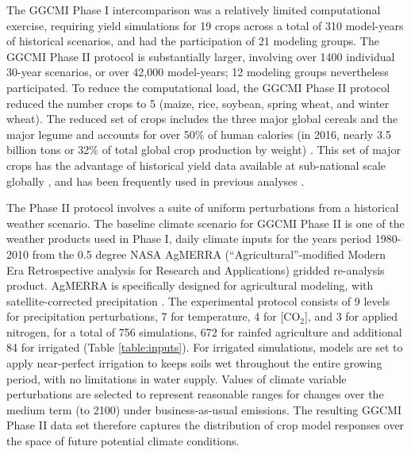 \documentclass[gmd, manuscript]{copernicus} %
\begin{document}
The GGCMI Phase I intercomparison was a relatively limited computational exercise, requiring yield simulations for 19 crops across a total of 310 model-years of historical scenarios, and had the participation of 21 modeling groups.
The GGCMI Phase II protocol is substantially larger, involving over 1400 individual 30-year scenarios, or over 42,000 model-years; 12 modeling groups nevertheless participated. To reduce the computational load, the GGCMI Phase II protocol reduced the number crops to 5 (maize, rice, soybean, spring wheat, and winter wheat). 
The reduced set of crops includes the three major global cereals and the major legume and accounts for over 50\% of human calories (in 2016, nearly 3.5 billion tons or 32\% of total global crop production by weight) \citep{FAOSTAT}. This set of major crops has the advantage of  historical yield data available at sub-national scale globally \citep{Ray2012,iizumi_historical_2014}, and has been frequently used in previous analyses \citep[e.g.][]{muller_global_2017,porwollik_spatial_2016}.  %

The Phase II protocol involves a suite of uniform perturbations from a historical weather scenario. 
The baseline climate scenario for GGCMI Phase II is one of the weather products used in Phase I, daily climate inputs for the years period 1980-2010 from the 0.5 degree NASA AgMERRA (``Agricultural''-modified Modern Era Retrospective analysis for Research and Applications) gridded re-analysis product. AgMERRA is specifically designed for agricultural modeling, with satellite-corrected precipitation \citep{Ruane2015}. 
The experimental protocol consists of 9 levels for precipitation perturbations, 7 for temperature, 4 for [CO$_2$], and 3 for applied nitrogen, for a total of 756 simulations, 672 for rainfed agriculture and additional 84 for irrigated (Table \ref{table:inputs}).  For irrigated simulations, models are set to apply near-perfect irrigation to keeps soils wet throughout the entire growing period, with no limitations in water supply. 
Values of climate variable perturbations are selected to represent reasonable ranges for changes over the medium term (to 2100) under business-as-usual emissions. 
The resulting GGCMI Phase II data set therefore captures the distribution of crop model responses over the space of future potential climate conditions.
\end{document}
